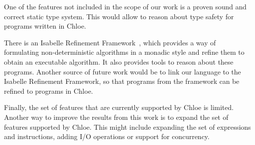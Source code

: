 One of the features not included in the scope of our work is a proven sound and correct static type system.
This would allow to reason about type safety for programs written in Chloe.

There is an Isabelle Refinement Framework~\parencite{Refine_Monadic-AFP}, which provides a way of formulating non-deterministic algorithms in a monadic style and refine them to obtain an executable algorithm.
It also provides tools to reason about these programs.
Another source of future work would be to link our language to the Isabelle Refinement Framework, so that programs from the framework can be refined to programs in Chloe.

Finally, the set of features that are currently supported by Chloe is limited.
Another way to improve the results from this work is to expand the set of features supported by Chloe.
This might include expanding the set of expressions and instructions, adding I/O operations or support for concurrency.

